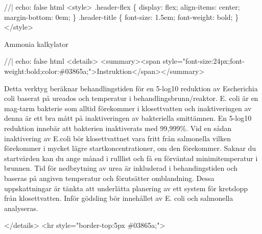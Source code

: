 \documentclass[
  a4paper,
  DIV=11,
  numbers=noendperiod]{scrartcl}
\author{}
\date{}
\newenvironment{Shaded}{\begin{snugshade}}{\end{snugshade}}
\newcommand{\NormalTok}[1]{\textcolor[rgb]{0.00,0.23,0.31}{#1}}
\begin{document}
\begin{Shaded}
\begin{Highlighting}[]
\NormalTok{//| echo: false}
\NormalTok{html\textasciigrave{}}
\NormalTok{\textless{}style\textgreater{}}
\NormalTok{.header{-}flex \{}
\NormalTok{  display: flex;}
\NormalTok{  align{-}items: center;}
\NormalTok{  margin{-}bottom: 0em;}
\NormalTok{\}}
\NormalTok{.header{-}title \{}
\NormalTok{  font{-}size: 1.5em;}
\NormalTok{  font{-}weight: bold;}
\NormalTok{\}}
\NormalTok{\textless{}/style\textgreater{}}
\NormalTok{\textasciigrave{}}
\end{Highlighting}
\end{Shaded}

Ammonia
kalkylator

\begin{Shaded}
\begin{Highlighting}[]
\NormalTok{//| echo: false}
\NormalTok{html\textasciigrave{}}
\NormalTok{\textless{}details\textgreater{}}
\NormalTok{ \textless{}summary\textgreater{}\textless{}span style="font{-}size:24px;font{-}weight:bold;color:\#03865a;"\textgreater{}Instruktion\textless{}/span\textgreater{}\textless{}/summary\textgreater{}}

\NormalTok{Detta verktyg beräknar behandlingstiden för en 5{-}log10 reduktion av Escherichia coli baserat på ureados och temperatur i behandlingsbrunn/reaktor. E. coli är en mag{-}tarm bakterie som alltid förekommer i klosettvatten och inaktiveringen av denna är ett bra mått på inaktiveringen av bakteriella smittämnen. En 5{-}log10 reduktion innebär att bakterien inaktiverats med 99,999\%. Vid en sådan inaktivering av E.coli bör klosettvattnet vara fritt från salmonella vilken förekommer i mycket lägre startkoncentrationer, om den förekommer. Saknar du startvärden kan du ange månad i rulllist och få en förväntad minimitemperatur i brunnen. Tid för nedbrytning av urea är inkluderad i behandingstiden och baseras på angiven temperatur och förutsätter omblandning.  Dessa uppskattningar är tänkta att underlätta planering av ett system för kretslopp från klosettvatten. Inför gödsling bör innehållet av E. coli och salmonella analyseras.}

\NormalTok{\textless{}/details\textgreater{}}
\NormalTok{\textless{}hr style="border{-}top:5px  \#03865a;"\textgreater{}}
\NormalTok{\textasciigrave{}}
\end{Highlighting}
\end{Shaded}
\end{document}

